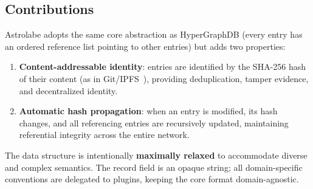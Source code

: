 \subsection{Contributions}

Astrolabe adopts the same core abstraction as HyperGraphDB (every entry has an ordered reference list pointing to other entries) but adds two properties:
\begin{enumerate}
  \item \textbf{Content-addressable identity}: entries are identified by the SHA-256 hash of their content (as in Git/IPFS~\cite{IPLD}), providing deduplication, tamper evidence, and decentralized identity.
  \item \textbf{Automatic hash propagation}: when an entry is modified, its hash changes, and all referencing entries are recursively updated, maintaining referential integrity across the entire network.
\end{enumerate}

The data structure is intentionally \textbf{maximally relaxed} to accommodate diverse and complex semantics. The record field is an opaque string; all domain-specific conventions are delegated to plugins, keeping the core format domain-agnostic.
